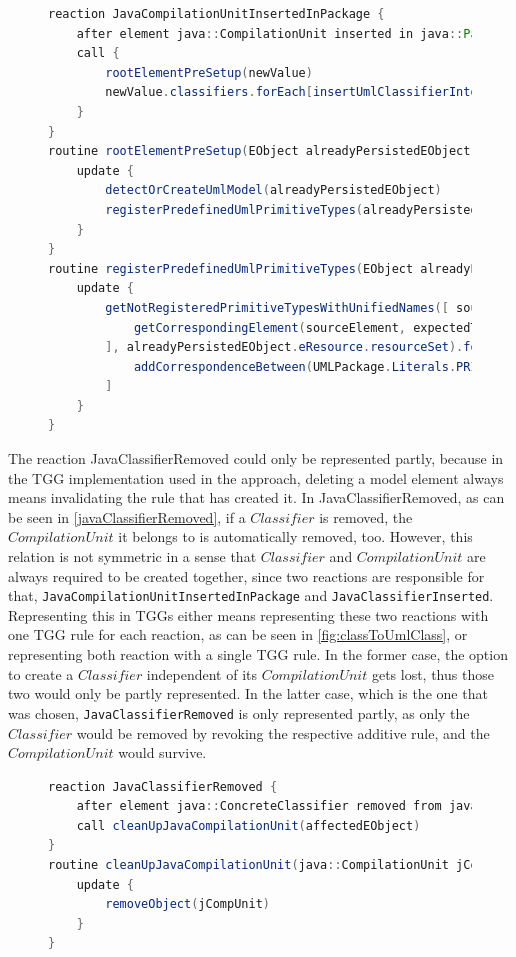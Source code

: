 \begin{figure}
\centering
\begin{lstlisting}[language=java, caption={Reaction JavaCompilationUnitInsertedInPackage},captionpos=b, label=javaCompilationUnitInsertedInPackage]
reaction JavaCompilationUnitInsertedInPackage {
	after element java::CompilationUnit inserted in java::Package[compilationUnits]
	call {
		rootElementPreSetup(newValue)
		newValue.classifiers.forEach[insertUmlClassifierIntoPackage(it, affectedEObject)]
	}
}
routine rootElementPreSetup(EObject alreadyPersistedEObject) {
	update {
		detectOrCreateUmlModel(alreadyPersistedEObject)
		registerPredefinedUmlPrimitiveTypes(alreadyPersistedEObject)
	}
}
routine registerPredefinedUmlPrimitiveTypes(EObject alreadyPersistedEObject) {
	update {
		getNotRegisteredPrimitiveTypesWithUnifiedNames([ sourceElement, expectedType, tag |
			getCorrespondingElement(sourceElement, expectedType, null, tag, false)
		], alreadyPersistedEObject.eResource.resourceSet).forEach [
			addCorrespondenceBetween(UMLPackage.Literals.PRIMITIVE_TYPE, it.key, it.value)
		]
	}
}
\end{lstlisting}  
\end{figure}

The reaction JavaClassifierRemoved could only be represented partly, because in the TGG implementation used in the approach, deleting a model element always means invalidating the rule that has created it.
In JavaClassifierRemoved, as can be seen in \autoref{javaClassifierRemoved}, if a $Classifier$ is removed, the $CompilationUnit$ it belongs to is automatically removed, too. However, this relation is not symmetric in a sense that $Classifier$ and $CompilationUnit$ are always required to be created together, since two reactions are responsible for that, \texttt{JavaCompilationUnitInsertedInPackage} and \texttt{JavaClassifierInserted}.
Representing this in TGGs either means representing these two reactions with one TGG rule for each reaction, as can be seen in \autoref{fig:classToUmlClass}, or representing both reaction with a single TGG rule.
In the former case, the option to create a $Classifier$ independent of its $CompilationUnit$ gets lost, thus those two would only be partly represented. In the latter case, which is the one that was chosen, \texttt{JavaClassifierRemoved} is only represented partly, as only the $Classifier$ would be removed by revoking the respective additive rule, and the $CompilationUnit$ would survive.

\begin{figure}
\centering
\begin{lstlisting}[language=java, caption={Reaction JavaCompilationUnitInsertedInPackage},captionpos=b, label=javaClassifierRemoved]
reaction JavaClassifierRemoved {
	after element java::ConcreteClassifier removed from java::CompilationUnit[classifiers]
	call cleanUpJavaCompilationUnit(affectedEObject)
}
routine cleanUpJavaCompilationUnit(java::CompilationUnit jCompUnit) {
	update {
		removeObject(jCompUnit)
	}
}
\end{lstlisting}  
\end{figure}

